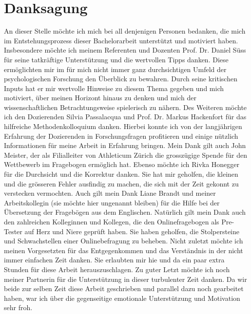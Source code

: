 %
%
\thispagestyle{empty} 
\let\raggedsection\centering
\chapter*{Danksagung}\label{label.danksagung}
\let\raggedsection\raggedright 
An dieser Stelle möchte ich mich bei all denjenigen Personen bedanken, die mich im Entstehungsprozess dieser Bachelorarbeit unterstützt und motiviert haben. Insbesondere möchte ich meinem Referenten und Dozenten Prof. Dr. Daniel Süss für seine tatkräftige Unterstützung und die wertvollen Tipps danken. Diese ermöglichten mir im für mich nicht immer ganz durchsichtigen Umfeld der psychologischen Forschung den Überblick zu bewahren. Durch seine kritischen Inputs hat er mir wertvolle Hinweise zu diesem Thema gegeben und mich motiviert, über meinen Horizont hinaus zu denken und mich der wissenschaftlichen Betrachtungsweise spielerisch zu nähern. Des Weiteren möchte ich den Dozierenden Silvia Passalacqua und Prof. Dr. Markus Hackenfort für das hilfreiche Methodenkolloquium danken. Hierbei konnte ich von der langjährigen Erfahrung der Dozierenden in Forschungsfragen profitieren und einige nützlich Informationen für meine Arbeit in Erfahrung bringen. Mein Dank gilt auch John Meister, der als Filialleiter von Athleticum Zürich die grosszügige Spende für den Wettbewerb im Fragebogen ermöglich hat. Ebenso möchte ich Rivka Honegger für die Durchsicht und die Korrektur danken. Sie hat mir geholfen, die kleinen und die grösseren Fehler ausfindig zu machen, die sich mit der Zeit gekonnt zu verstecken vermochten. Auch gilt mein Dank Liane Brandt und meiner Arbeitskollegin (sie möchte hier ungenannt bleiben) für die Hilfe bei der Übersetzung der Fragebögen aus dem Englischen. Natürlich gilt mein Dank auch den zahlreichen Kolleginnen und Kollegen, die den Onlinefragebogen als Pre-Tester auf Herz und Niere geprüft haben. Sie haben geholfen, die Stolpersteine und Schwachstellen einer Onlinebefragung zu beheben. Nicht zuletzt möchte ich meinen Vorgesetzten für das Entgegenkommen und das Verständnis in der nicht immer einfachen Zeit danken. Sie erlaubten mir hie und da ein paar extra Stunden für diese Arbeit herauszuschlagen. Zu guter Letzt möchte ich noch meiner Partnerin für die Unterstützung in dieser turbulenter Zeit danken. Da wir beide zur selben Zeit diese Arbeit geschrieben und parallel dazu noch gearbeitet haben, war ich über die gegenseitige emotionale Unterstützung und Motivation sehr froh. 
